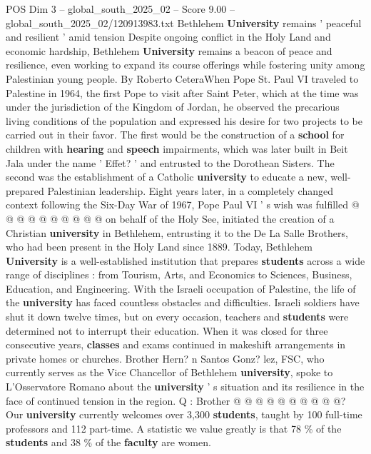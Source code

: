 \begin{textsample}{POS Dim 3 – global\_south\_2025\_02 – Score 9.00 – global\_south\_2025\_02/120913983.txt}  \label{ex:f3_pos_410}
Bethlehem \textbf{University} remains ' peaceful and resilient ' amid tension Despite ongoing conflict in the Holy Land and economic hardship, Bethlehem \textbf{University} remains a beacon of peace and resilience, even working to expand its course offerings while fostering unity among Palestinian young people.
By Roberto CeteraWhen Pope St.
Paul VI traveled to Palestine in 1964, the first Pope to visit after Saint Peter, which at the time was under the jurisdiction of the Kingdom of Jordan, he observed the precarious living conditions of the population and expressed his desire for two projects to be carried out in their favor.
The first would be the construction of a \textbf{school} for children with \textbf{hearing} and \textbf{speech} impairments, which was later built in Beit Jala under the name ' Effet? ' and entrusted to the Dorothean Sisters.
The second was the establishment of a Catholic \textbf{university} to educate a new, well-prepared Palestinian leadership.
Eight years later, in a completely changed context following the Six-Day War of 1967, Pope Paul VI ' s wish was fulfilled @ @ @ @ @ @ @ @ @ @ on behalf of the Holy See, initiated the creation of a Christian \textbf{university} in Bethlehem, entrusting it to the De La Salle Brothers, who had been present in the Holy Land since 1889.
Today, Bethlehem \textbf{University} is a well-established institution that prepares \textbf{students} across a wide range of disciplines : from Tourism, Arts, and Economics to Sciences, Business, Education, and Engineering.
With the Israeli occupation of Palestine, the life of the \textbf{university} has faced countless obstacles and difficulties.
Israeli soldiers have shut it down twelve times, but on every occasion, teachers and \textbf{students} were determined not to interrupt their education.
When it was closed for three consecutive years, \textbf{classes} and exams continued in makeshift arrangements in private homes or churches.
Brother Hern? n Santos Gonz? lez, FSC, who currently serves as the Vice Chancellor of Bethlehem \textbf{university}, spoke to L'Osservatore Romano about the \textbf{university} ' s situation and its resilience in the face of continued tension in the region.
Q : Brother @ @ @ @ @ @ @ @ @ @?
Our \textbf{university} currently welcomes over 3,300 \textbf{students}, taught by 100 full-time professors and 112 part-time.
A statistic we value greatly is that 78 \% of the \textbf{students} and 38 \% of the \textbf{faculty} are women.

\end{textsample}
